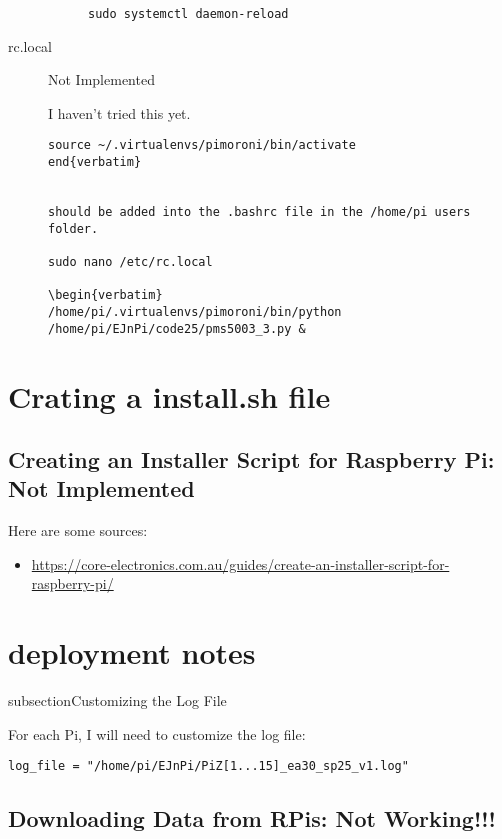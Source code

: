 \documentclass{article}
\begin{document}
\begin{description}
\begin{description}
\begin{verbatim}
sudo systemctl daemon-reload
\end{verbatim}


\end{description}

\item[rc.local] Not Implemented

I haven't tried this yet.

\begin{verbatim}
source ~/.virtualenvs/pimoroni/bin/activate 
end{verbatim}


should be added into the .bashrc file in the /home/pi users folder.

sudo nano /etc/rc.local

\begin{verbatim}
/home/pi/.virtualenvs/pimoroni/bin/python /home/pi/EJnPi/code25/pms5003_3.py &
\end{verbatim}

\end{description}


\section{Crating a install.sh file}

\subsection{Creating an Installer Script for Raspberry Pi: Not Implemented}

Here are some sources:
\begin{itemize}
\item \url{https://core-electronics.com.au/guides/create-an-installer-script-for-raspberry-pi/}
\end{itemize}


\section{deployment notes}

subsection{Customizing the Log File}

For each Pi, I will need to customize the log file: 

\begin{verbatim}
log_file = "/home/pi/EJnPi/PiZ[1...15]_ea30_sp25_v1.log"
\end{verbatim}

\subsection{Downloading Data from RPis: Not Working!!!}
\end{document}
